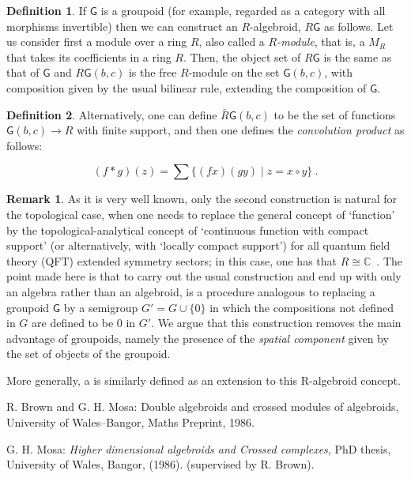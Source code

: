 \documentclass[12pt]{article}
\theoremstyle{plain}
\theoremstyle{definition}
\newtheorem{definition}{Definition}[section]
\newtheorem{remark}{Remark}[section]
\numberwithin{equation}{section}
\newcommand{\med}{\medbreak}
\newcommand{\lra}{{\longrightarrow}}
\begin{document}
\begin{definition}
If $\mathsf{G}$ is a groupoid (for example, regarded as a category with all morphisms invertible) 
then we can construct an $R$-algebroid, $R\mathsf{G}$ as follows. Let us consider first a module over a ring $R$, also called a {\em $R$-module}, that is, a  $M_R$ that takes its coefficients in a ring $R$. Then, the object set of $R\mathsf{G}$ is the same as that of $\mathsf{G}$ and $R\mathsf{G}(b,c)$ is the free $R$-module on the set $\mathsf{G}(b,c)$, with composition given by the usual bilinear rule, extending the composition of $\mathsf{G}$.
\end{definition}

\begin{definition}
Alternatively, one can define $\bar{R}\mathsf{G}(b,c)$ to be the set of functions $\mathsf{G}(b,c)\lra R$ with finite support, and then one defines the \emph{convolution product} as follows:
\end{definition}
\med
\begin{equation}
(f*g)(z)= \sum \{(fx)(gy)\mid z=x\circ y \} ~.
\end{equation}


\begin{remark} 
 As it is very well known, only the second construction is natural
for the topological case, when one needs to replace the general concept of `function' by
the topological-analytical concept of `continuous function with compact support' (or alternatively, with `locally
compact support') for all quantum field theory (QFT) extended symmetry sectors; in this case, one has that $R \cong \mathbb{C}$~. 
The point made here is that to carry out the usual construction and end up with only an algebra
rather than an algebroid, is a procedure analogous to replacing a
groupoid $\mathsf{G}$ by a semigroup $G'=G\cup \{0\}$ in which the
compositions not defined in $G$ are defined to be $0$ in $G'$. We
argue that this construction removes the main advantage of
groupoids, namely the presence of the {\em spatial component} given by the set of objects of the groupoid. 
 
 More generally, a  is similarly defined as an extension to this R-algebroid
concept. 
\end{remark}
\begin{thebibliography}{9}

R. Brown and G. H. Mosa: Double algebroids and crossed modules of algebroids, University of Wales--Bangor, Maths Preprint, 1986.

G. H. Mosa: \emph{Higher dimensional algebroids and Crossed
complexes}, PhD thesis, University of Wales, Bangor, (1986). (supervised by R. Brown).

\end{thebibliography}

\end{document}
